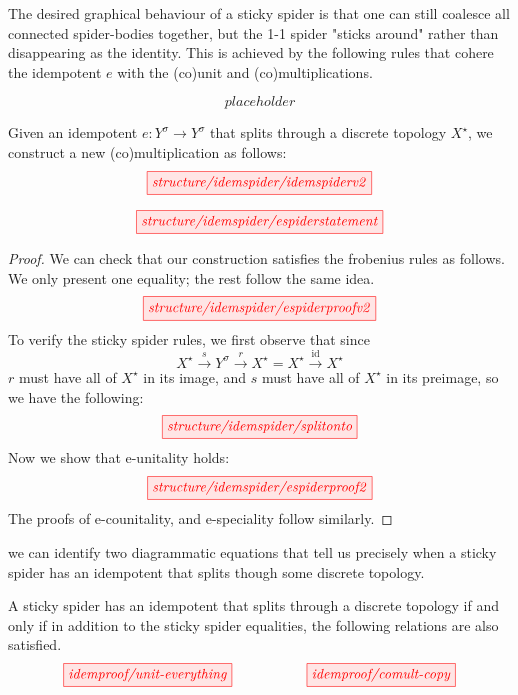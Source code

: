 \begin{fullwidth}
\begin{defn}
The desired graphical behaviour of a sticky spider is that one can still coalesce all connected spider-bodies together, but the 1-1 spider "sticks around" rather than disappearing as the identity. This is achieved by the following rules that cohere the idempotent $e$ with the (co)unit and (co)multiplications.

\[placeholder\]
\end{defn}

\begin{construction}
Given an idempotent $e: Y^\sigma \rightarrow Y^\sigma$ that splits through a discrete topology $X^\star$, we construct a new (co)multiplication as follows:
\[\scalebox{1}{\tikzfig{structure/idemspider/idemspiderv2}}\]
\end{construction}

\begin{proposition}\label{prop:splitmeanssticky}
\[\scalebox{1}{\tikzfig{structure/idemspider/espiderstatement}}\]
\begin{proof}
We can check that our construction satisfies the frobenius rules as follows. We only present one equality; the rest follow the same idea.
\[\scalebox{1}{\tikzfig{structure/idemspider/espiderproofv2}}\]
To verify the sticky spider rules, we first observe that since \[X^\star \overset{s}{\rightarrow} Y^\sigma \overset{r}{\rightarrow} X^\star = X^\star \overset{\mathop{id}}{\rightarrow} X^\star\]
$r$ must have all of $X^\star$ in its image, and $s$ must have all of $X^\star$ in its preimage, so we have the following:
\[\scalebox{1}{\tikzfig{structure/idemspider/splitonto}}\]
Now we show that e-unitality holds:
\[\scalebox{1}{\tikzfig{structure/idemspider/espiderproof2}}\]
The proofs of e-counitality, and e-speciality follow similarly.
\end{proof}
\end{proposition}

 we can identify two diagrammatic equations that tell us precisely when a sticky spider has an idempotent that splits though some discrete topology.

\begin{theorem}\label{thm:stickygraphical}
A sticky spider has an idempotent that splits through a discrete topology if and only if in addition to the sticky spider equalities, the following relations are also satisfied.
\[\scalebox{1}{\tikzfig{idemproof/unit-everything}} \quad\quad\quad\quad \scalebox{1}{\tikzfig{idemproof/comult-copy}}\]
\end{theorem}


\end{fullwidth}
